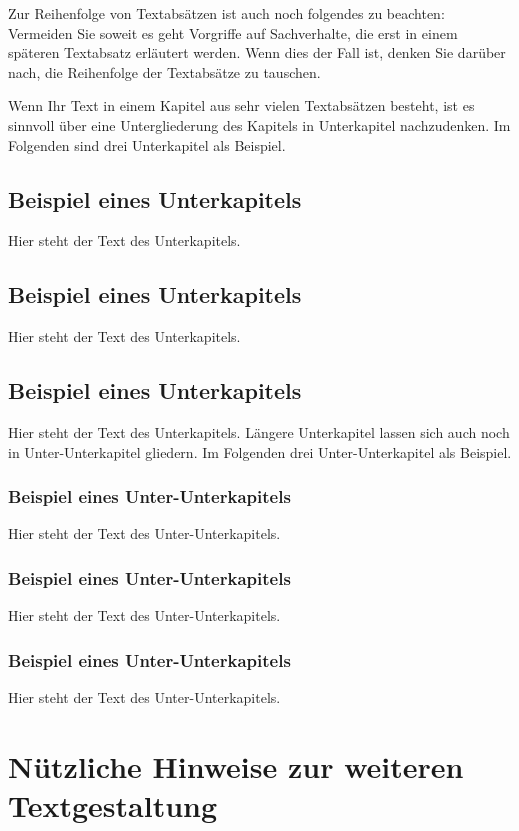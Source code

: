 \documentclass[a4paper,twoside]{IEEEtran}
\begin{document}
Zur Reihenfolge von Textabsätzen ist auch noch folgendes zu beachten: Vermeiden Sie soweit es geht Vorgriffe auf Sachverhalte, die erst in einem späteren Textabsatz erläutert werden. Wenn dies der Fall ist, denken Sie darüber nach, die Reihenfolge der Textabsätze zu tauschen.

Wenn Ihr Text in einem Kapitel aus sehr vielen Textabsätzen besteht, ist es sinnvoll über eine Untergliederung des Kapitels in Unterkapitel nachzudenken. Im Folgenden sind drei Unterkapitel als Beispiel.

\subsection{Beispiel eines Unterkapitels}
Hier steht der Text des Unterkapitels.

\subsection{Beispiel eines Unterkapitels}
Hier steht der Text des Unterkapitels.

\subsection{Beispiel eines Unterkapitels}
Hier steht der Text des Unterkapitels. Längere Unterkapitel lassen sich auch noch in Unter-Unterkapitel gliedern. Im Folgenden drei  Unter-Unterkapitel als Beispiel.

\subsubsection{Beispiel eines Unter-Unterkapitels}
Hier steht der Text des Unter-Unterkapitels.
\subsubsection{Beispiel eines Unter-Unterkapitels}
Hier steht der Text des Unter-Unterkapitels.
\subsubsection{Beispiel eines Unter-Unterkapitels}
Hier steht der Text des Unter-Unterkapitels.


\section{Nützliche Hinweise zur weiteren Textgestaltung} 
\end{document}
